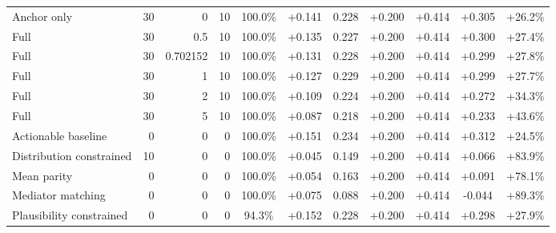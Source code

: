 \begin{table}[htbp]
\begin{tabular}{lrrrccccccc}
Anchor only & 30 & 0 & 10 & 100.0\% & +0.141 & 0.228 & +0.200 & +0.414 & +0.305 & +26.2\% \\
Full & 30 & 0.5 & 10 & 100.0\% & +0.135 & 0.227 & +0.200 & +0.414 & +0.300 & +27.4\% \\
Full & 30 & 0.702152 & 10 & 100.0\% & +0.131 & 0.228 & +0.200 & +0.414 & +0.299 & +27.8\% \\
Full & 30 & 1 & 10 & 100.0\% & +0.127 & 0.229 & +0.200 & +0.414 & +0.299 & +27.7\% \\
Full & 30 & 2 & 10 & 100.0\% & +0.109 & 0.224 & +0.200 & +0.414 & +0.272 & +34.3\% \\
Full & 30 & 5 & 10 & 100.0\% & +0.087 & 0.218 & +0.200 & +0.414 & +0.233 & +43.6\% \\
Actionable baseline & 0 & 0 & 0 & 100.0\% & +0.151 & 0.234 & +0.200 & +0.414 & +0.312 & +24.5\% \\
Distribution constrained & 10 & 0 & 0 & 100.0\% & +0.045 & 0.149 & +0.200 & +0.414 & +0.066 & +83.9\% \\
Mean parity & 0 & 0 & 0 & 100.0\% & +0.054 & 0.163 & +0.200 & +0.414 & +0.091 & +78.1\% \\
Mediator matching & 0 & 0 & 0 & 100.0\% & +0.075 & 0.088 & +0.200 & +0.414 & -0.044 & +89.3\% \\
Plausibility constrained & 0 & 0 & 0 & 94.3\% & +0.152 & 0.228 & +0.200 & +0.414 & +0.298 & +27.9\% \\
\bottomrule
\end{tabular}
\end{table}